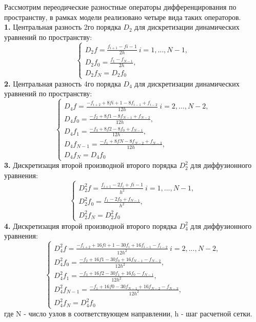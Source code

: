 \documentclass[12pt,a4paper]{article} %
\begin{document}
	Рассмотрим переодические разностные операторы дифференцирования по пространству, в рамках модели реализовано четыре вида таких операторов.\\[1mm]
	\textbf{1.} Центральная разность 2го порядка $D_2$ для дискретизации динамических уравнений по пространству:
	$$ \begin{cases}
	   D_2f = \frac{f_{i+1} - f{i-1}}{2h} \ i=1,...,N - 1, \\[1mm]
	   D_2f_{0} = \frac{f_{1} - f_{N - 1}}{2h}, \\[1mm]
	   D_2f_{N} = D_2f_{0}
	\end{cases}$$
	\textbf{2.}   Центральная разность 4го порядка $D_4$ для дискретизации динамических уравнений по пространству:
	$$ \begin{cases}
	   D_4f = \frac{-f_{i+2} + 8f{i+1} - 8f_{i-1} + f_{i-2}}{12h} \ i=2,...,N - 2, \\[1mm]
	   D_4f_{0} = \frac{-f_{2} + 8f{1} - 8f_{N-1} + f_{N-2}}{12h}, \\[1mm]
	   D_4f_{1} = \frac{-f_{3} + 8f{2} - 8f_{0} + f_{N-1}}{12h}, \\[1mm]
	   D_4f_{N-1} = \frac{-f_{1} + 8f{N} - 8f_{N-2} + f_{N-3}}{12h}, \\[1mm]
	   D_4f_{N} = D_4f_{0}
	\end{cases}$$
	\textbf{3.} Дискретизация второй производной второго порядка $D^2_2$ для диффузионного уравнения:
	$$ \begin{cases}
	   D^2_2f = \frac{f_{i+1} - 2f_i + f{i-1}}{h^2} \ i=1,...,N - 1, \\[1mm]
	   D^2_2f_{0} = \frac{f_{1} - 2f_{0} + f_{N - 1}}{h^2}, \\[1mm]
	   D^2_2f_{N} = D^2_2f_{0}
	\end{cases}$$
	\textbf{4.} Дискретизация второй производной второго порядка $D^2_4$ для диффузионного уравнения:
	$$ \begin{cases}
	   D^2_4f = \frac{-f_{i+2} + 16f{i+1} - 30f_i + 16f_{i-1} - f_{i-2}}{12h^2} \ i=2,...,N - 2, \\[1mm]
	   D^2_4f_{0} = \frac{-f_{2} + 16f{1} - 30f_0 + 16f_{N-1} - f_{N-2}}{12h^2}, \\[1mm]
	   D^2_4f_{1} = \frac{-f_{3} + 16f{2} - 30f_1 + 16f_{0} - f_{N-1}}{12h^2}, \\[1mm]
	   D^2_4f_{N-1} = \frac{-f_{1} + 16f{0} - 30f_{N-1} + 16f_{N-2} - f_{N-3}}{12h^2}, \\[1mm]
	   D^2_4f_{N} = D^2_4f_{0}
	\end{cases}$$
	где N - число узлов в соответствующем направлении, h - шаг расчетной сетки.
 
\end{document}

